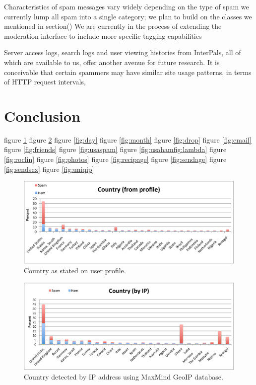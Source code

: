 \documentclass[preprint]{acm_proc_article-sp}
\begin{document}
Characteristics of spam messages vary widely depending on the type of spam
we currently lump all spam into a single category; we plan to build on the classes we mentioned in section()
We are currently in the process of extending the moderation interface to include more specific tagging capabilities

Server access logs, search logs and user viewing histories from InterPals, all of which are available to us, offer another avenue for future research. It is conceivable that certain spammers may have similar site usage patterns, in terms of HTTP request intervals, 

\section{Conclusion}




figure \ref{fig:cprof}
figure \ref{fig:cip}
figure \ref{fig:day}
figure \ref{fig:month}
figure \ref{fig:drop}
figure \ref{fig:email}
figure \ref{fig:friends}
figure \ref{fig:usaspam}
figure \ref{fig:usahamfig:lambda}
figure \ref{fig:roclin}
figure \ref{fig:photos}
figure \ref{fig:recipage}
figure \ref{fig:sendage}
figure \ref{fig:sendsex}
figure \ref{fig:uniqip}
\begin{figure}[h]
    \centering
    \includegraphics[width=\linewidth]{figures/country-prof.pdf}
    \caption{Country as stated on user profile.}
    \label{fig:cprof}
\end{figure}

\begin{figure}[h]
    \centering
    \includegraphics[width=\linewidth]{figures/country-ip.pdf}
    \caption{Country detected by IP address using MaxMind GeoIP database.}
    \label{fig:cip}
\end{figure}
\end{document}
